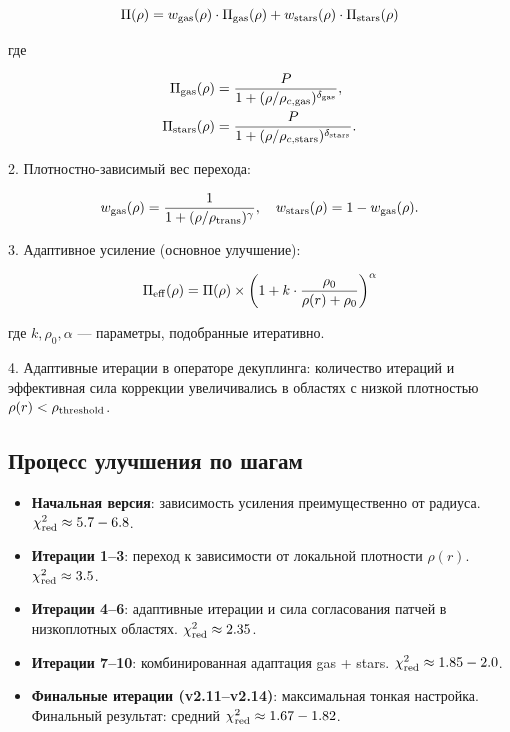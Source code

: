 \documentclass[11pt,a4paper]{article}
\begin{document}
\begin{equation}
\Pi(\rho) = w_{\rm gas}(\rho) \cdot \Pi_{\rm gas}(\rho) + w_{\rm stars}(\rho) \cdot \Pi_{\rm stars}(\rho)
\end{equation}

где

\begin{align}
\Pi_{\rm gas}(\rho) &= \frac{P}{1 + (\rho / \rho_{c,{\rm gas}})^{\delta_{\rm gas}}}, \\
\Pi_{\rm stars}(\rho) &= \frac{P}{1 + (\rho / \rho_{c,{\rm stars}})^{\delta_{\rm stars}}}.
\end{align}

2. Плотностно-зависимый вес перехода:

\begin{equation}
w_{\rm gas}(\rho) = \frac{1}{1 + (\rho / \rho_{\rm trans})^{\gamma}}, \quad w_{\rm stars}(\rho) = 1 - w_{\rm gas}(\rho).
\end{equation}

3. Адаптивное усиление (основное улучшение):

\begin{equation}
\Pi_{\rm eff}(\rho) = \Pi(\rho) \times \left(1 + k \cdot \frac{\rho_0}{\rho(r) + \rho_0}\right)^{\alpha}
\end{equation}

где \( k, \rho_0, \alpha \) — параметры, подобранные итеративно.

4. Адаптивные итерации в операторе декуплинга: количество итераций и эффективная сила коррекции увеличивались в областях с низкой плотностью \(\rho(r) < \rho_{\rm threshold}\).

\subsection{Процесс улучшения по шагам}

\begin{itemize}
    \item \textbf{Начальная версия}: зависимость усиления преимущественно от радиуса. \(\chi^2_{\rm red} \approx 5.7-6.8\).
    \item \textbf{Итерации 1--3}: переход к зависимости от локальной плотности \(\rho(r)\). \(\chi^2_{\rm red} \approx 3.5\).
    \item \textbf{Итерации 4--6}: адаптивные итерации и сила согласования патчей в низкоплотных областях. \(\chi^2_{\rm red} \approx 2.35\).
    \item \textbf{Итерации 7--10}: комбинированная адаптация gas + stars. \(\chi^2_{\rm red} \approx 1.85-2.0\).
    \item \textbf{Финальные итерации (v2.11--v2.14)}: максимальная тонкая настройка. Финальный результат: средний \(\chi^2_{\rm red} \approx 1.67-1.82\).
\end{itemize}
\end{document}
